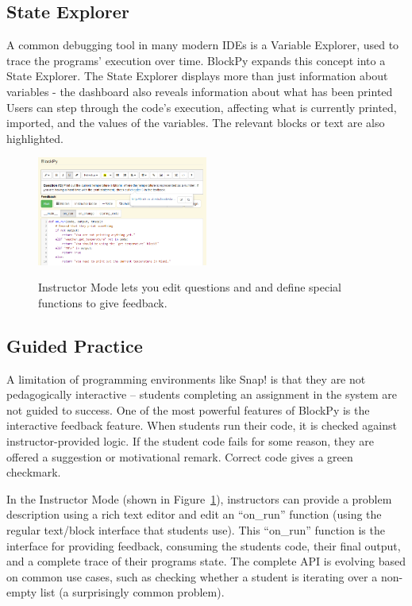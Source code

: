 \documentclass{sig-alternate}
\begin{document}
\subsection{State Explorer}

A common debugging tool in many modern IDEs is a Variable Explorer, used to trace the programs' execution over time.
BlockPy expands this concept into a State Explorer. 
The State Explorer displays more than just information about variables - the dashboard also reveals information about what has been printed 
Users can step through the code's execution, affecting what is currently printed, imported, and the values of the variables.
The relevant blocks or text are also highlighted.

\begin{figure}
\includegraphics[width=0.5\textwidth]{images/blockpyTeacherEditing}
\label{fig-teacher-view}
\caption{Instructor Mode lets you edit questions and and define special functions to give feedback.}
\end{figure}

\subsection{Guided Practice}

A limitation of programming environments like Snap! is that they are not pedagogically interactive --
students completing an assignment in the system are not guided to success.
One of the most powerful features of BlockPy is the interactive feedback feature.
When students run their code, it is checked against instructor-provided logic.
If the student code fails for some reason, they are offered a suggestion or motivational remark.
Correct code gives a green checkmark.

In the Instructor Mode (shown in Figure~\ref{fig-teacher-view}), instructors can provide a problem description using a rich text editor and edit an ``on\_run'' function (using the regular text/block interface that students use).
This ``on\_run'' function is the interface for providing feedback, consuming the students code, their final output, and a complete trace of their programs state.
The complete API is evolving based on common use cases, such as checking whether a student is iterating over a non-empty list (a surprisingly common problem).
\end{document}
